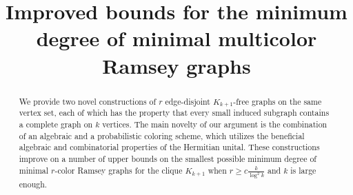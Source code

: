 \documentclass[12pt]{article}
\title{Improved bounds for the minimum degree of minimal multicolor Ramsey graphs}
\theoremstyle{definition}
\begin{document}
	\maketitle
	\begin{abstract}
		
		We provide two novel constructions of $r$ edge-disjoint $K_{k+1}$-free graphs on the same vertex set, each of which has the property that every small induced subgraph contains a complete graph on $k$ vertices. The main novelty of our argument is the combination of an algebraic and a probabilistic coloring scheme, which utilizes the beneficial algebraic and combinatorial properties of the Hermitian unital. These constructions improve on a number of upper bounds on the smallest possible minimum degree of minimal $r$-color Ramsey graphs for the clique $K_{k+1}$ when $r\geq c\frac{k}{\log^2 k}$ and $k$ is large enough.  
	\end{abstract}
\end{document}
